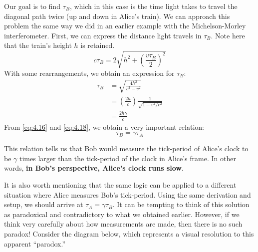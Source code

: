 \documentclass[a4paper,11pt]{article}
\numberwithin{equation}{section}
\begin{document}
 \noindent Our goal is to find $\tau_{B}$, which in this case is the time light takes to travel the diagonal path twice (up and down in Alice's train). We can approach this problem the same way we did in an earlier example with the Michelson-Morley interferometer. First, we can express the distance light travels in $\tau_{B}$. Note here that the train's height $h$ is retained. 
 \begin{equation}\label{eq:4.17}
 c\tau_{B}=2\sqrt{h^2 + {\left(\frac{v\tau_{B}}{2}\right)}^{2}}
 \end{equation}
 With some rearrangements, we obtain an expression for $\tau_{B}$:
 \begin{equation}\label{eq:4.18}
 \begin{split}
 \tau_{B}&=\sqrt{\frac{4h^2}{c^2-v^2}}\\
 &=\left(\frac{2h}{c}\right)\frac{1}{\sqrt{1-v^2/c^2}}\\
 &=\frac{2h\gamma}{c}
 \end{split}
 \end{equation}
 From \eqref{eq:4.16} and \eqref{eq:4.18}, we obtain a very important relation:
 \begin{equation}\label{eq:4.19}
 \tau_{B}=\gamma\tau_{A}
 \end{equation}
 
 \noindent This relation tells us that Bob would measure the tick-period of Alice's clock to be $\gamma$ times larger than the tick-period of the clock in Alice's frame. In other words, \textbf{in Bob's perspective, Alice's clock runs slow}. 
 
 \noindent It is also worth mentioning that the same logic can be applied to a different situation where Alice measures Bob's tick-period. Using the same derivation and setup, we should arrive at $\tau_{A} = \gamma\tau_{B}$. It can be tempting to think of this solution as paradoxical and contradictory to what we obtained earlier. However, if we think very carefully about how measurements are made, then there is no such paradox! Consider the diagram below, which represents a visual resolution to this apparent ``paradox.''
 
\end{document}
